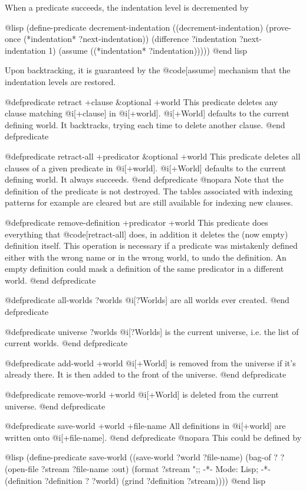 {When a predicate succeeds, the indentation level is decremented by

@lisp
(define-predicate decrement-indentation
  ((decrement-indentation)
   (prove-once (*indentation* ?next-indentation))
   (difference ?indentation ?next-indentation 1)
   (assume ((*indentation* ?indentation)))))
@end lisp

Upon backtracking, it is guaranteed by the @code[assume] mechanism that
the indentation levels are restored.

@defpredicate retract +clause &optional +world
This predicate deletes any clause matching @i[+clause] in @i[+world].
@i[+World] defaults to the current defining world.
It backtracks, trying each time to delete another clause.
@end defpredicate

@defpredicate retract-all +predicator &optional +world
This predicate deletes all clauses of a given predicate in @i[+world].
@i[+World] defaults to the current defining world.
It always succeeds.
@end defpredicate
@nopara
Note that the definition of the predicate is not destroyed.
The tables associated with indexing patterns for example are cleared but are
still available for indexing new clauses.

@defpredicate remove-definition +predicator +world
This predicate does everything that @code[retract-all] does, in addition
it deletes the (now empty) definition itself. This operation is
necessary if a predicate was mistakenly defined either with the wrong
name or in the wrong world, to undo the definition. An empty definition
could mask a definition of the same predicator in a different world.
@end defpredicate

@defpredicate all-worlds ?worlds
@i[?Worlds] are all worlds ever created.
@end defpredicate

@defpredicate universe ?worlds
@i[?Worlds] is the current universe, i.e. the list of current worlds.
@end defpredicate

@defpredicate add-world +world
@i[+World] is removed from the universe if it's already there. It is then 
added to the front of the universe.
@end defpredicate

@defpredicate remove-world +world
@i[+World] is deleted from the current universe.
@end defpredicate

@defpredicate save-world +world +file-name
All definitions in @i[+world] are written onto @i[+file-name].
@end defpredicate
@nopara
This could be defined by

@lisp
(define-predicate save-world
  ((save-world ?world ?file-name)
   (bag-of ? ?
     (open-file ?stream ?file-name :out)
     (format ?stream ";; -*- Mode: Lisp; -*-~%
     (definition ?definition ? ?world)
     (grind ?definition ?stream))))
@end lisp

}
